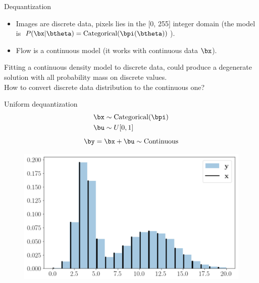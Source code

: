 

\begin{frame}
\titlepage
\end{frame}
\begin{frame}{Dequantization}
	\begin{itemize}
		\item Images are discrete data, pixels lies in the [0, 255] integer domain (the model is $P(\bx | \btheta) = \text{Categorical}(\bpi(\btheta))$).
		\item Flow is a continuous model (it works with continuous data $\bx$).
	\end{itemize}
	Fitting a continuous density model to discrete data, could produce a degenerate solution with all probability mass on discrete values. \\
	How to convert discrete data distribution to the continuous one?
	
	\begin{minipage}[t]{0.5\columnwidth}
		\begin{block}{Uniform dequantization}
		\vspace{-0.5cm}
			\begin{align*}
				\bx &\sim \text{Categorical}(\bpi) \\
				 \bu &\sim U[0, 1]
			\end{align*}
			\[
			\by = \bx + \bu \sim \text{Continuous} 
			\]
		\end{block}
	\end{minipage}%
	\begin{minipage}[t]{0.5\columnwidth}
		\begin{figure}
			\centering
			\includegraphics[width=1.0\linewidth]{figs/uniform_dequantization.png}
		\end{figure}
	\end{minipage}
\end{frame}
